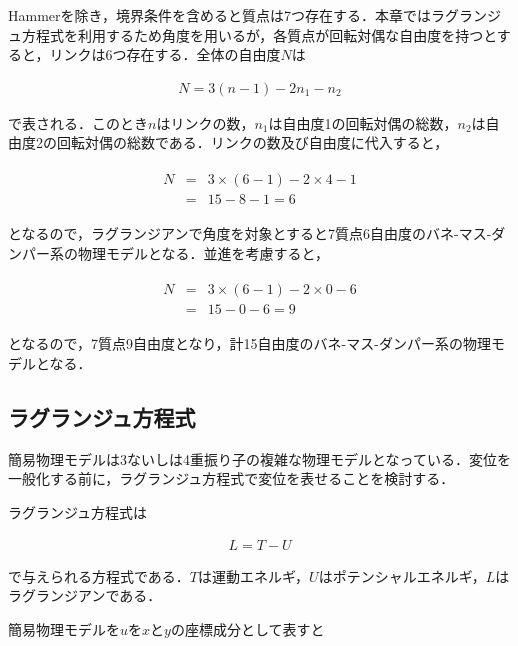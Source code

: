 Hammerを除き，境界条件を含めると質点は7つ存在する．本章ではラグランジュ方程式を利用するため角度を用いるが，各質点が回転対偶な自由度を持つとすると，リンクは6つ存在する．全体の自由度$N$は

\begin{eqnarray}
    N = 3(n - 1) - 2n_1-n_2
\end{eqnarray}

で表される．このとき$n$はリンクの数，$n_1$は自由度1の回転対偶の総数，$n_2$は自由度2の回転対偶の総数である．リンクの数及び自由度に代入すると，

\begin{eqnarray}
    \begin{matrix}
        N &=& 3\times (6 - 1) - 2 \times 4 - 1 \\
          &=& 15 - 8 - 1 = 6
    \end{matrix}
\end{eqnarray}

となるので，ラグランジアンで角度を対象とすると7質点6自由度のバネ-マス-ダンパー系の物理モデルとなる．並進を考慮すると，

\begin{eqnarray}
    \begin{matrix}
        N &=& 3\times (6 - 1) - 2 \times 0 - 6 \\
          &=& 15 - 0 - 6 = 9
    \end{matrix}
\end{eqnarray}

となるので，7質点9自由度となり，計15自由度のバネ-マス-ダンパー系の物理モデルとなる．


\subsection{ラグランジュ方程式}

簡易物理モデルは3ないしは4重振り子の複雑な物理モデルとなっている．変位を一般化する前に，ラグランジュ方程式で変位を表せることを検討する．

ラグランジュ方程式は

\begin{eqnarray}
    L = T - U    
\end{eqnarray}

で与えられる方程式である．$T$は運動エネルギ，$U$はポテンシャルエネルギ，$L$はラグランジアンである．

簡易物理モデルを$u$を$x$と$y$の座標成分として表すと

